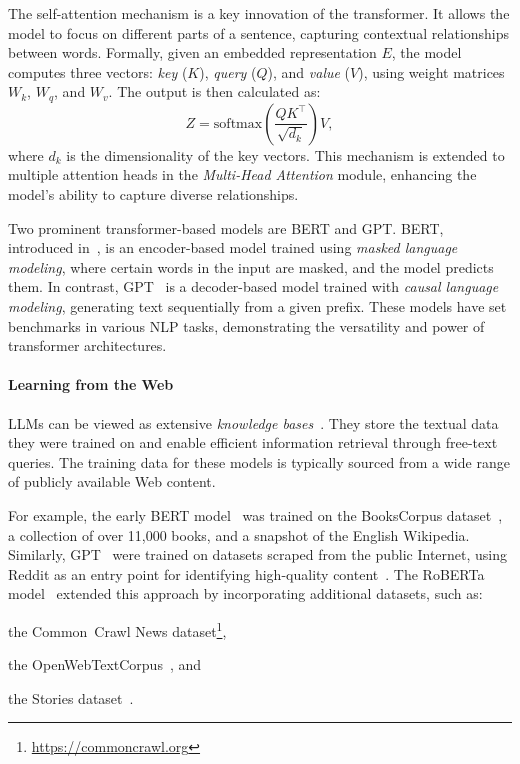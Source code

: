 The self-attention mechanism is a key innovation of the transformer.
%
It allows the model to focus on different parts of a sentence, capturing contextual relationships between words.
%
Formally, given an embedded representation \(E\), the model computes three vectors: \emph{key} (\(K\)), \emph{query} (\(Q\)), and \emph{value} (\(V\)), using weight matrices \(W_k\), \(W_q\), and \(W_v\).
%
The output is then calculated as:
%
\[
Z = \text{softmax}\left(\frac{QK^\top}{\sqrt{d_k}}\right)V,
\]
%
where \(d_k\) is the dimensionality of the key vectors.
%
This mechanism is extended to multiple attention heads in the \emph{Multi-Head Attention} module, enhancing the model's ability to capture diverse relationships.

Two prominent transformer-based models are BERT and GPT.
%
BERT, introduced in~\cite{DBLP:conf/naacl/DevlinCLT19}, is an encoder-based model trained using \emph{masked language modeling}, where certain words in the input are masked, and the model predicts them.
%
In contrast, GPT~\cite{radford2018improving} is a decoder-based model trained with \emph{causal language modeling}, generating text sequentially from a given prefix.
%
These models have set benchmarks in various \gls{NLP} tasks, demonstrating the versatility and power of transformer architectures.


\paragraph{Learning from the Web}

\glspl{LLM} can be viewed as extensive \emph{knowledge bases}~\cite{PetroniRRLBWM19}.
%
They store the textual data they were trained on and enable efficient information retrieval through free-text queries.
%
The training data for these models is typically sourced from a wide range of publicly available Web content.

%
For example, the early BERT model~\cite{DBLP:conf/naacl/DevlinCLT19} was trained on the BooksCorpus dataset~\cite{ZhuKZSUTF15}, a collection of over 11,000 books, and a snapshot of the English Wikipedia.
%
Similarly, GPT~\cite{gpt2-2019,gpt3-2020} were trained on datasets scraped from the public Internet, using Reddit as an entry point for identifying high-quality content~\cite{training-data-attack-2021}.
%
The RoBERTa model~\cite{roberta-2019} extended this approach by incorporating additional datasets, such as:
%
\begin{inlinelist}
    \item the Common~Crawl News dataset\footnote{\url{https://commoncrawl.org}},
    \item the OpenWebTextCorpus~\cite{Gokaslan2019OpenWeb}, and
    \item the Stories dataset~\cite{TrieuQuoc2018}.
\end{inlinelist}

